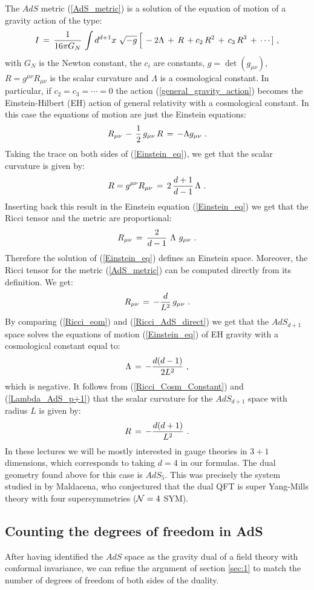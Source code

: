 \documentclass[12pt,notitlepage,a4paper]{article}
\newcommand{\beq}{\begin{equation}}
\newcommand{\eeq}{\end{equation}}
\begin{document}
The $AdS$ metric (\ref{AdS_metric})  is a solution of the equation of motion of a gravity action of the type:
\beq
I\,=\,{1\over 16\pi G_N}\,
\int d^{d+1}x\,\,\sqrt{-g}\,\Big[\,-2\Lambda\,+\,R\,+c_2\, R^2\,+\,c_3\, R^3\,+\,\cdots]\,\,,
\label{general_gravity_action}
\eeq
with $G_N$ is the Newton constant, the $c_i$ are constants, $g=\det (g_{\mu\nu})$, $R=g^{\mu\nu}R_{\mu\nu}$  is the scalar curvature and $\Lambda$ is a  cosmological constant. In particular, if $c_2=c_3=\cdots = 0$  the action (\ref{general_gravity_action}) becomes the Einstein-Hilbert (EH) action of general relativity with a cosmological constant. In this case the equations of motion  are just  the Einstein equations:
\beq
R_{\mu\nu}\,-\,{1\over 2}\,g_{\mu\nu}\,R\,=\,-\Lambda g_{\mu\nu}\,\,.
\label{Einstein_eq}
\eeq
Taking the trace on both sides of (\ref{Einstein_eq}), we get that the scalar curvature is given by:
\beq
R=g^{\mu\nu}R_{\mu\nu}\,=\,2\,{d+1\over d-1}\,\Lambda\,\,.
\label{Ricci_Cosm_Constant}
\eeq
Inserting back this result in the Einstein equation (\ref{Einstein_eq}) we get that  the Ricci tensor and the metric are proportional:
\beq
R_{\mu\nu}\,=\,{2\over d-1}\,\,\Lambda\,\,g_{\mu\nu}\,\,.
\label{Ricci_eom}
\eeq	
Therefore the  solution of (\ref{Einstein_eq}) defines an Einstein space. Moreover, the Ricci tensor for the metric (\ref{AdS_metric}) can be computed directly from  its definition. We get:
\beq
R_{\mu\nu}\,=\,-{d\over L^2}\,g_{\mu\nu}\,\,.
\label{Ricci_AdS_direct}
\eeq
By comparing  (\ref{Ricci_eom}) and (\ref{Ricci_AdS_direct})  we get that the $AdS_{d+1}$  space solves the equations of motion (\ref{Einstein_eq}) of EH gravity with  a cosmological constant equal to:
\beq
\Lambda\,=\,-{d(d-1)\over 2 L^2}\,\,,
\label{Lambda_AdS_p+1}
\eeq
which is negative. It follows from (\ref{Ricci_Cosm_Constant}) and (\ref{Lambda_AdS_p+1}) that the scalar curvature for the $AdS_{d+1}$ space with radius $L$  is given by:
\beq
R\,=\,-{d(d+1)\over L^2}\,\,.
\eeq
In these lectures we will be mostly interested in gauge theories in $3+1$ dimensions, which corresponds to taking $d=4$ in our formulas. The dual geometry found above for this case is $AdS_5$. This was precisely the system studied  in \cite{Maldacena:1997re} by Maldacena, who conjectured that the dual QFT is super Yang-Mills theory with four supersymmetries  (${\cal N}=4$ SYM).  






\subsection{Counting the degrees of freedom in AdS}
\label{subsec:2.1}
After having identified the $AdS$ space as the gravity dual of a field theory with conformal invariance, we can refine the argument of section \ref{sec:1} to match the number of  degrees of freedom of both sides of the duality. 
\end{document}
